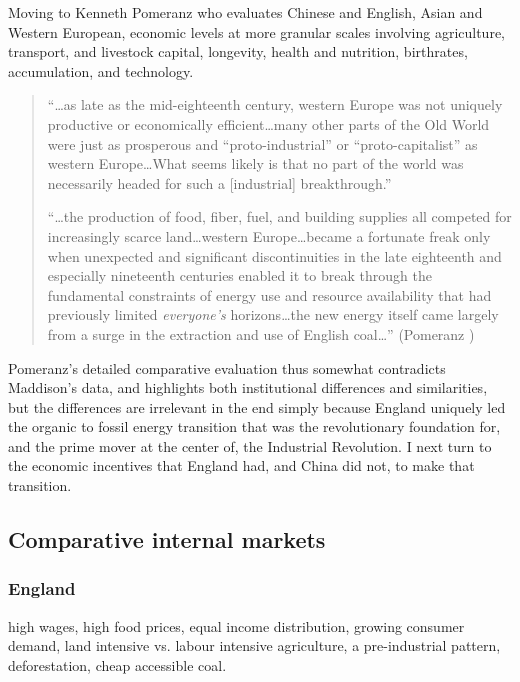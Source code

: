 \documentclass[12pt]{article}
\numberwithin{equation}{section}
\begin{document}
		
		Moving to Kenneth Pomeranz who evaluates Chinese and English, Asian and Western European, economic levels at more granular scales involving agriculture, transport, and livestock capital, longevity, health and nutrition, birthrates, accumulation, and technology.
		
		\begin{quotation}
		``\ldots as late as the mid-eighteenth century, western Europe was not uniquely productive or economically efficient\ldots many other parts of the Old World were just as prosperous and ``proto-industrial'' or ``proto-capitalist'' as western Europe\ldots What seems likely is that no part of the world was necessarily headed for such a [industrial] breakthrough.''
		
		``\ldots the production of food, fiber, fuel, and building supplies all competed for increasingly scarce land\ldots western Europe\ldots became a fortunate freak only when unexpected and significant discontinuities in the late eighteenth and especially nineteenth centuries enabled it to break through the fundamental constraints of energy use and resource availability that had previously limited \textit{everyone's} horizons\dots the new energy itself came largely from a surge in the extraction and use of English coal\ldots'' (Pomeranz \citeyear[pp.~206--07]{pomeranz_great_2001})
		\end{quotation} 
		
		Pomeranz's detailed comparative evaluation thus somewhat contradicts Maddison's data, and highlights both institutional differences and similarities, but the differences are irrelevant in the end simply because England uniquely led the organic to fossil energy transition that was the revolutionary foundation for, and the prime mover at the center of, the Industrial Revolution. I next turn to the economic incentives that England had, and China did not, to make that transition.
		
		\subsection{Comparative internal markets}
			\subsubsection{England}
			high wages, high food prices, equal income distribution, growing consumer demand, land intensive vs. labour intensive agriculture, a pre-industrial pattern, deforestation, cheap accessible coal.
\end{document}
